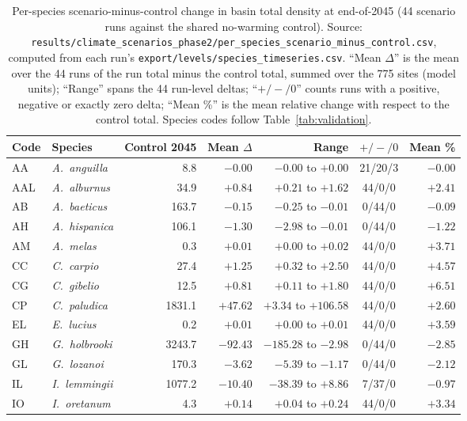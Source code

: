 \documentclass[11pt,a4paper]{article}
\begin{document}
\begin{table}[H]
\centering
\caption{Per-species scenario-minus-control change in basin total density at end-of-2045 (44 scenario runs against the shared no-warming control). Source: \texttt{results/climate\_scenarios\_phase2/per\_species\_scenario\_minus\_control.csv}, computed from each run's \texttt{export/levels/species\_timeseries.csv}. ``Mean $\Delta$'' is the mean over the 44 runs of the run total minus the control total, summed over the 775 sites (model units); ``Range'' spans the 44 run-level deltas; ``$+/-/0$'' counts runs with a positive, negative or exactly zero delta; ``Mean \%'' is the mean relative change with respect to the control total. Species codes follow Table~\ref{tab:validation}.}
\label{tab:per-species}
\small
\begin{tabular}{@{}l l r r r c r@{}}
\toprule
Code & Species & Control 2045 & Mean $\Delta$ & Range & $+/-/0$ & Mean \% \\
\midrule
AA & \textit{A.~anguilla} & 8.8 & $-0.00$ & $-0.00$ to $+0.00$ & 21/20/3 & $-0.00$ \\
AAL & \textit{A.~alburnus} & 34.9 & $+0.84$ & $+0.21$ to $+1.62$ & 44/0/0 & $+2.41$ \\
AB & \textit{A.~baeticus} & 163.7 & $-0.15$ & $-0.25$ to $-0.01$ & 0/44/0 & $-0.09$ \\
AH & \textit{A.~hispanica} & 106.1 & $-1.30$ & $-2.98$ to $-0.01$ & 0/44/0 & $-1.22$ \\
AM & \textit{A.~melas} & 0.3 & $+0.01$ & $+0.00$ to $+0.02$ & 44/0/0 & $+3.71$ \\
CC & \textit{C.~carpio} & 27.4 & $+1.25$ & $+0.32$ to $+2.50$ & 44/0/0 & $+4.57$ \\
CG & \textit{C.~gibelio} & 12.5 & $+0.81$ & $+0.11$ to $+1.80$ & 44/0/0 & $+6.51$ \\
CP & \textit{C.~paludica} & 1831.1 & $+47.62$ & $+3.34$ to $+106.58$ & 44/0/0 & $+2.60$ \\
EL & \textit{E.~lucius} & 0.2 & $+0.01$ & $+0.00$ to $+0.01$ & 44/0/0 & $+3.59$ \\
GH & \textit{G.~holbrooki} & 3243.7 & $-92.43$ & $-185.28$ to $-2.98$ & 0/44/0 & $-2.85$ \\
GL & \textit{G.~lozanoi} & 170.3 & $-3.62$ & $-5.39$ to $-1.17$ & 0/44/0 & $-2.12$ \\
IL & \textit{I.~lemmingii} & 1077.2 & $-10.40$ & $-38.39$ to $+8.86$ & 7/37/0 & $-0.97$ \\
IO & \textit{I.~oretanum} & 4.3 & $+0.14$ & $+0.04$ to $+0.24$ & 44/0/0 & $+3.34$ \\

\end{tabular}
\end{table}
\end{document}
